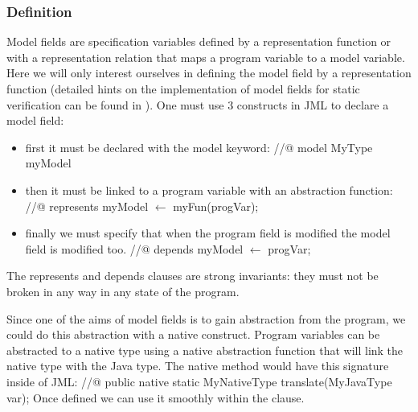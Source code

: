 \subsubsection{Definition}
Model fields are specification variables defined by a representation 
function or with a representation relation that maps a program variable 
to a model variable. 
Here we will only interest ourselves in defining the model field by 
a representation function (detailed hints on the implementation of 
model fields for static verification can be found in 
 \cite{LeinoMueller06,breunesse03verifying}). 
One must use 3 constructs in JML to declare a model field:
\begin{itemize}
\item first it must be declared with the model keyword: 
\btab 
//@ model MyType myModel
\etab
\item then it must be linked to a program variable with an abstraction function:
\btab
//@ represents myModel $\leftarrow$ myFun(progVar);
\etab
\item finally we must specify that when the program field is modified the model field is modified too.
\btab
//@ depends myModel $\leftarrow$ progVar;
\etab
\end{itemize}
The represents and depends clauses are strong invariants: they must not be broken 
in any way in any state of the program.

Since one of the aims of model fields is to gain abstraction from the program, 
we could do this abstraction with a native construct. Program variables can be 
abstracted to a native type using a native abstraction function that will link
 the native type with the Java type. The native method would have this signature inside of JML:
\btab
//@ public native static MyNativeType translate(MyJavaType var);
\etab
Once defined we can use it smoothly within the  clause.
